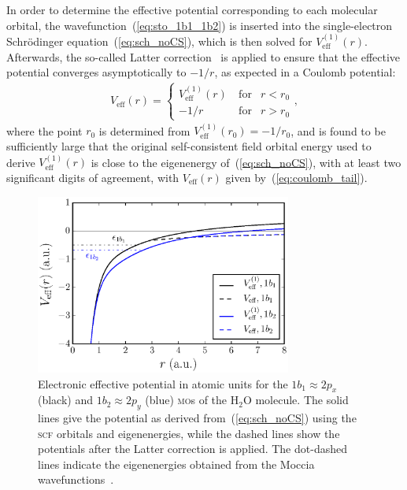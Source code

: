 In order to determine the effective potential corresponding to each
molecular orbital, the wavefunction~(\ref{eq:sto_1b1_1b2}) is inserted
into the single-electron Schr\"{o}dinger equation~(\ref{eq:sch_noCS}),
which is then solved for $V_{\mathrm{eff}}^{(1)}(r)$. Afterwards, the
so-called Latter correction~\cite{LatterCor_1955,sarias_2016} is
applied to ensure that the effective potential converges
asymptotically to $-1/r$, as expected in a Coulomb potential:
%
\begin{eqnarray}
V_{\mathrm{eff}}(r) = \left\{
\begin{split}
V_{\mathrm{eff}}^{(1)}(r)\  & \mathrm{for} & r < r_{0} \\
-1/r\  & \mathrm{for} & r > r_{0}
\end{split}
\right.
,
\label{eq:coulomb_tail}
\end{eqnarray}
%
where the point $r_{0}$ is determined from $V_{\mathrm{eff}}^{(1)}(r_{0}) =
-1/r_{0}$, and is found to be sufficiently large that the original
self-consistent field orbital energy used to derive
$V_{\mathrm{eff}}^{(1)}(r)$ is close to the eigenenergy
of~(\ref{eq:sch_noCS}), with at least two significant digits of
agreement, with $V_{\mathrm{eff}}(r)$ given
by~(\ref{eq:coulomb_tail}).

\begin{figure}
  \centering
  \includegraphics[width=0.75\textwidth]{figures/ch_H2O/1b1_1b2/Veff1b11b2.eps}
  \caption{Electronic effective potential in atomic units for the
    $1b_{1}\approx 2p_{x}$ (black) and $1b_{2}\approx 2p_{y}$ (blue)
    \textsc{mo}s of the H$_{2}$O molecule. The solid lines give the
    potential as derived from~(\ref{eq:sch_noCS}) using the
    \textsc{scf} orbitals and eigenenergies, while the dashed lines
    show the potentials after the Latter correction is applied. The
    dot-dashed lines indicate the eigenenergies obtained from the
    Moccia wavefunctions~\cite{Moccia_1964}.}
  \label{fig:Veff1b11b2}
\end{figure}

